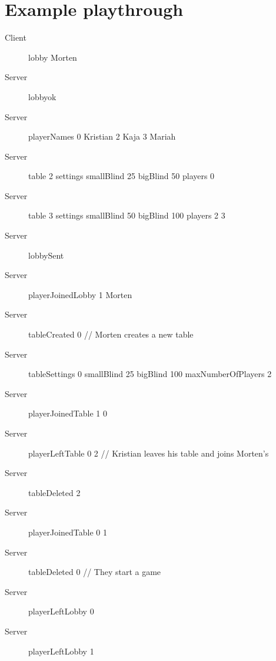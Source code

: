 \documentclass{article}
\begin{document}
\section{Example playthrough}
\begin{description}
\item[Client] lobby Morten
\item[Server] lobbyok
\item[Server] playerNames 0 Kristian 2 Kaja 3 Mariah
\item[Server] table 2 settings smallBlind 25 bigBlind 50 players 0
\item[Server] table 3 settings smallBlind 50 bigBlind 100 players 2 3
\item[Server] lobbySent
\item[Server] playerJoinedLobby 1 Morten
\item[Server] tableCreated 0 // Morten creates a new table
\item[Server] tableSettings 0 smallBlind 25 bigBlind 100 maxNumberOfPlayers 2
\item[Server] playerJoinedTable 1 0
\item[Server] playerLeftTable 0 2 // Kristian leaves his table and joins Morten's
\item[Server] tableDeleted 2
\item[Server] playerJoinedTable 0 1
\item[Server] tableDeleted 0 // They start a game
\item[Server] playerLeftLobby 0
\item[Server] playerLeftLobby 1
\end{description}
\end{document}
